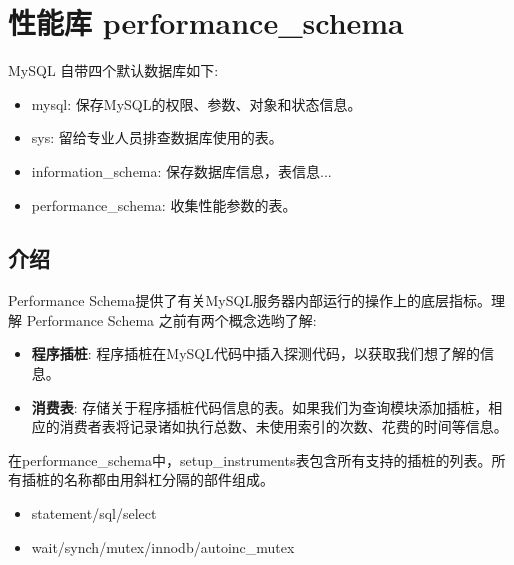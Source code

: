 \section{性能库 performance\_schema}

MySQL 自带四个默认数据库如下:
\begin{itemize}
    \item mysql: 保存MySQL的权限、参数、对象和状态信息。
    \item sys: 留给专业人员排查数据库使用的表。
    \item information\_schema: 保存数据库信息，表信息...
    \item performance\_schema: 收集性能参数的表。
\end{itemize}

\subsection{介绍}

Performance Schema提供了有关MySQL服务器内部运行的操作上的底层指标。理解 Performance Schema 之前有两个概念选哟了解:
\begin{itemize}
    \item \textbf{程序插桩}: 程序插桩在MySQL代码中插入探测代码，以获取我们想了解的信息。
    \item \textbf{消费表}: 存储关于程序插桩代码信息的表。如果我们为查询模块添加插桩，相应的消费者表将记录诸如执行总数、未使用索引的次数、花费的时间等信息。
\end{itemize}

\begin{figure}[H]
    \centering
\end{figure}

在performance\_schema中，setup\_instruments表包含所有支持的插桩的列表。所有插桩的名称都由用斜杠分隔的部件组成。
\begin{itemize}
    \item statement/sql/select
    \item wait/synch/mutex/innodb/autoinc\_mutex
\end{itemize}

